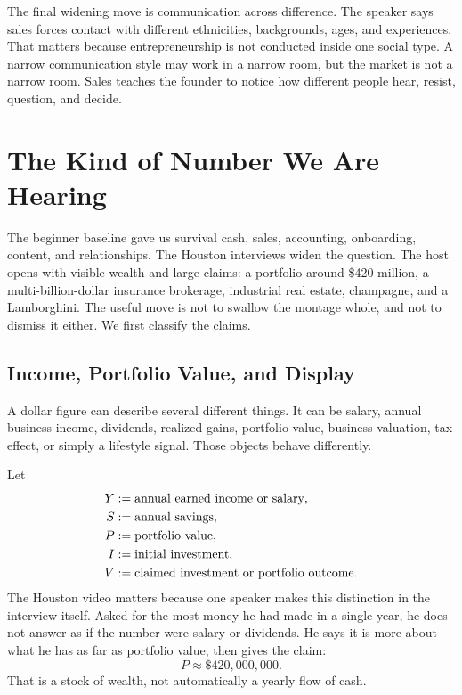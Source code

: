 \documentclass[11pt,oneside]{book}
\begin{document}
The final widening move is communication across difference. The speaker says sales forces contact with different ethnicities, backgrounds, ages, and experiences. That matters because entrepreneurship is not conducted inside one social type. A narrow communication style may work in a narrow room, but the market is not a narrow room. Sales teaches the founder to notice how different people hear, resist, question, and decide.


\chapter{The Kind of Number We Are Hearing}

The beginner baseline gave us survival cash, sales, accounting, onboarding, content, and relationships. The Houston interviews widen the question. The host opens with visible wealth and large claims: a portfolio around \$420 million, a multi-billion-dollar insurance brokerage, industrial real estate, champagne, and a Lamborghini. The useful move is not to swallow the montage whole, and not to dismiss it either. We first classify the claims.

\section{Income, Portfolio Value, and Display}

A dollar figure can describe several different things. It can be salary, annual business income, dividends, realized gains, portfolio value, business valuation, tax effect, or simply a lifestyle signal. Those objects behave differently.

Let
\begin{align}
Y &:= \hbox{annual earned income or salary},\\
S &:= \hbox{annual savings},\\
P &:= \hbox{portfolio value},\\
I &:= \hbox{initial investment},\\
V &:= \hbox{claimed investment or portfolio outcome}.
\end{align}
The Houston video matters because one speaker makes this distinction in the interview itself. Asked for the most money he had made in a single year, he does not answer as if the number were salary or dividends. He says it is more about what he has as far as portfolio value, then gives the claim:
\[
P\approx \$420{,}000{,}000.
\]
That is a stock of wealth, not automatically a yearly flow of cash.
\end{document}
